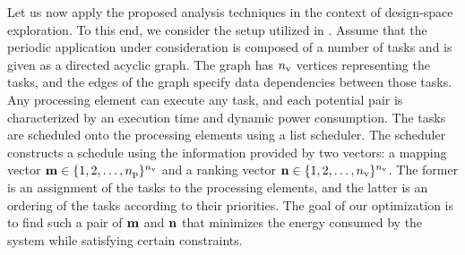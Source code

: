 Let us now apply the proposed analysis techniques in the context of design-space exploration.
To this end, we consider the setup utilized in \cite{ukhov2012}.
Assume that the periodic application under consideration is composed of a number of tasks and is given as a directed acyclic graph.
The graph has ${n_\text{v}}$ vertices representing the tasks, and the edges of the graph specify data dependencies between those tasks.
Any processing element can execute any task, and each potential pair is characterized by an execution time and dynamic power consumption.
The tasks are scheduled onto the processing elements using a list scheduler.
The scheduler constructs a schedule using the information provided by two vectors: a mapping vector $\mathbf{m} \in \{ 1, 2, \dotsc, {n_\text{p}} \}^{n_\text{v}}$ and a ranking vector $\mathbf{n} \in \{ 1, 2, \dotsc, {n_\text{v}} \}^{n_\text{v}}$.
The former is an assignment of the tasks to the processing elements, and the latter is an ordering of the tasks according to their priorities.
The goal of our optimization is to find such a pair of $\mathbf{m}$ and $\mathbf{n}$ that minimizes the energy consumed by the system while satisfying certain constraints.

